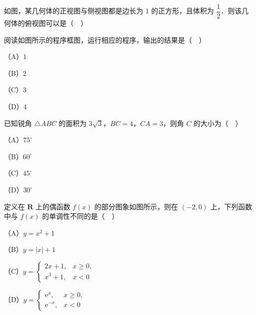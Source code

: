 \begingroup
\renewenvironment{question}{\Needspace{0.5\textheight}}{}
\begin{question}
如图，某几何体的正视图与侧视图都是边长为 $1$ 的正方形，且体积为 $\dfrac12$．则该几何体的俯视图可以是（　）
\nopagebreak[4]
\begin{center}\end{center}
\nopagebreak[4]
\Needspace{0.4\textheight}
\end{question}
\endgroup
\begingroup
\renewenvironment{question}{\Needspace{0.5\textheight}}{}
\begin{question}
阅读如图所示的程序框图，运行相应的程序，输出的结果是（　）
\nopagebreak[4]
\begin{center}\end{center}
\nopagebreak[4]
（A）$1$

（B）$2$

（C）$3$

（D）$4$

\end{question}
\endgroup
\begin{question}
已知锐角 $\triangle ABC$ 的面积为 $3\sqrt3$，$BC=4$，$CA=3$，则角 $C$ 的大小为（　）

（A）$75^\circ$

（B）$60^\circ$

（C）$45^\circ$

（D）$30^\circ$

\Needspace{0.4\textheight}
\end{question}
\begingroup
\renewenvironment{question}{\Needspace{0.5\textheight}}{}
\begin{question}
定义在 $\mathbf R$ 上的偶函数 $f(x)$ 的部分图象如图所示，则在 $(-2,0)$ 上，下列函数中与 $f(x)$ 的单调性不同的是（　）
\nopagebreak[4]
\begin{center}\end{center}
\nopagebreak[4]
（A）$y=x^2+1$

（B）$y=|x|+1$

（C）$y=\begin{cases}2x+1,&x\geqslant0,\\ x^3+1,&x<0\end{cases}$

（D）$y=\begin{cases}\mathrm e^x,&x\geqslant0,\\ \mathrm e^{-x},&x<0\end{cases}$

\end{question}
